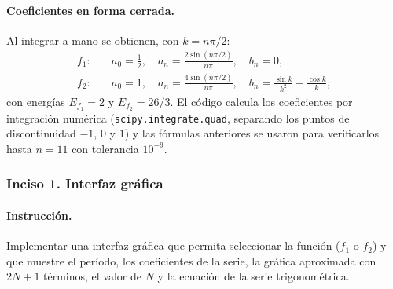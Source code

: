 \documentclass[11pt]{article}
\begin{document}
\paragraph{Coeficientes en forma cerrada.}
Al integrar a mano se obtienen, con $k=n\pi/2$:
\begin{align*}
 f_1:&\quad a_0=\tfrac12,\quad a_n=\frac{2\sin(n\pi/2)}{n\pi},\quad b_n=0,\\
 f_2:&\quad a_0=1,\quad a_n=\frac{4\sin(n\pi/2)}{n\pi},\quad
 b_n=\frac{\sin k}{k^2}-\frac{\cos k}{k},
\end{align*}
con energías $E_{f_1}=2$ y $E_{f_2}=26/3$. El código calcula los coeficientes por integración numérica
(\texttt{scipy.integrate.quad}, separando los puntos de discontinuidad $-1$, $0$ y $1$) y las fórmulas anteriores se usaron
para verificarlos hasta $n=11$ con tolerancia $10^{-9}$.

\subsubsection*{Inciso 1. Interfaz gráfica}

\paragraph{Instrucción.}
Implementar una interfaz gráfica que permita seleccionar la función ($f_1$ o $f_2$) y que muestre
el período, los coeficientes de la serie, la gráfica aproximada con $2N+1$ términos, el valor de $N$
y la ecuación de la serie trigonométrica.
\end{document}
